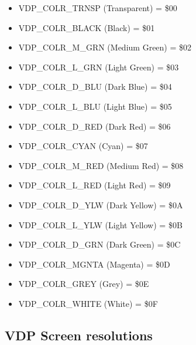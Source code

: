     \begin{itemize}
        \item VDP\_COLR\_TRNSP  (Transparent)   = \$00
        \item VDP\_COLR\_BLACK  (Black)         = \$01
        \item VDP\_COLR\_M\_GRN (Medium Green)  = \$02
        \item VDP\_COLR\_L\_GRN (Light Green)   = \$03
        \item VDP\_COLR\_D\_BLU (Dark Blue)     = \$04
        \item VDP\_COLR\_L\_BLU (Light Blue)    = \$05
        \item VDP\_COLR\_D\_RED (Dark Red)      = \$06
        \item VDP\_COLR\_CYAN   (Cyan)          = \$07
        \item VDP\_COLR\_M\_RED (Medium Red)    = \$08
        \item VDP\_COLR\_L\_RED (Light Red)     = \$09
        \item VDP\_COLR\_D\_YLW (Dark Yellow)   = \$0A
        \item VDP\_COLR\_L\_YLW (Light Yellow)  = \$0B
        \item VDP\_COLR\_D\_GRN (Dark Green)    = \$0C
        \item VDP\_COLR\_MGNTA  (Magenta)       = \$0D
        \item VDP\_COLR\_GREY   (Grey)          = \$0E
        \item VDP\_COLR\_WHITE  (White)         = \$0F
    \end{itemize}

    \subsection{VDP Screen resolutions}
    \label{sec:vdpscrmodes}


